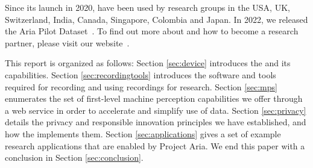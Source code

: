 Since its launch in 2020, \AriaDevices{} have been used by research groups in the USA, UK, Switzerland, India, Canada, Singapore, Colombia and Japan. In 2022, we released the Aria Pilot Dataset~\cite{ariapilot}. 
To find out more about \ProjectAria{} and how to become a research partner, please visit our website~\cite{ariawebsite}.

This report is organized as follows: Section \ref{sec:device} introduces the \AriaDevice{} and its capabilities. Section \ref{sec:recordingtools} introduces the software and tools required for recording and using recordings for research. Section \ref{sec:mps} enumerates the set of first-level machine perception capabilities we offer through a web service in order to accelerate and simplify use of \ProjectAria{} data. Section \ref{sec:privacy} details the privacy and responsible innovation principles we have established, and how the \AriaDevice{} implements them. Section \ref{sec:applications} gives a set of example research applications that are enabled by Project Aria. We end this paper with a conclusion in Section \ref{sec:conclusion}.
